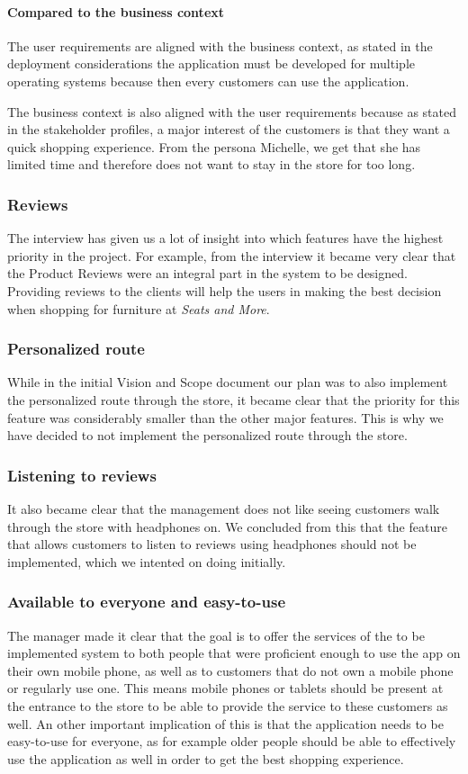 \documentclass[a4paper]{article}
\begin{document}
\paragraph{Compared to the business context}
The user requirements are aligned with the business context, as stated in the deployment considerations the application must be developed for multiple operating systems because then every customers can use the application.

The business context is also aligned with the user requirements because as stated in the stakeholder profiles, a major interest of the customers is that they want a quick shopping experience. From the persona Michelle, we get that she has limited time and therefore does not want to stay in the store for too long.

\subsubsection*{Reviews}
The interview has given us a lot of insight into which features have the highest priority in the project. For example, from the interview it became very clear that the Product Reviews were an integral part in the system to be designed. Providing reviews to the clients will help the users in making the best decision when shopping for furniture at \textit{Seats and More}.

\subsubsection*{Personalized route}
While in the initial Vision and Scope document our plan was to also implement the personalized route through the store, it  became clear that the priority for this feature was considerably smaller than the other major features. This is why we have decided to not implement the personalized route through the store. 

\subsubsection*{Listening to reviews}
It also became clear that the management does not like seeing customers walk through the store with headphones on. We concluded from this that the feature that allows customers to listen to reviews using headphones should not be implemented, which we intented on doing initially. 

\subsubsection*{Available to everyone and easy-to-use}
The manager made it clear that the goal is to offer the services of the to be implemented system to both people that were proficient enough to use the app on their own mobile phone, as well as to customers that do not own a mobile phone or regularly use one. This means mobile phones or tablets should be present at the entrance to the store to be able to provide the service to these customers as well. An other important implication of this is that the application needs to be easy-to-use for everyone, as for example older people should be able to effectively use the application as well in order to get the best shopping experience.
\end{document}
